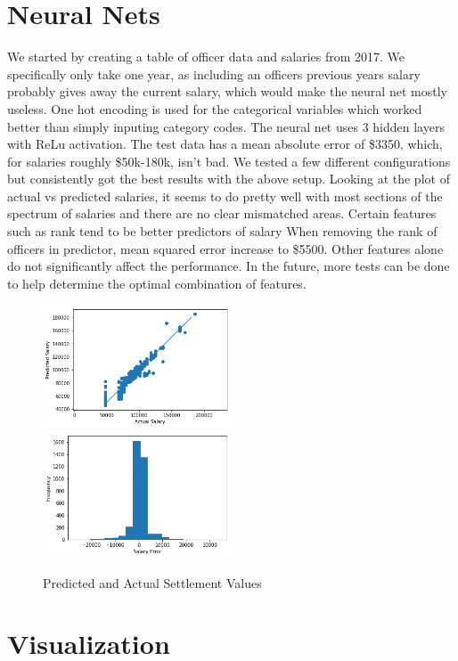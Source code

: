 \documentclass[11pt]{article}
\begin{document}
\FloatBarrier
\section{Neural Nets}

We started by creating a table of officer data and salaries from 2017. We specifically only take one year, as including an officers previous years salary probably gives away the current salary, which would make the neural net mostly useless. One hot encoding is used for the categorical variables which worked better than simply inputing category codes. The neural net uses 3 hidden layers with ReLu activation. The test data has a mean absolute error of \$3350, which, for salaries roughly \$50k-180k, isn't bad. We tested a few different configurations but consistently got the best results with the above setup. Looking at the plot of actual vs predicted salaries, it seems to do pretty well with most sections of the spectrum of salaries and there are no clear mismatched areas.
Certain features such as rank tend to be better predictors of salary
When removing the rank of officers in predictor, mean squared error increase to \$5500. Other features alone do not significantly affect the performance. In the future, more tests can be done to help determine the optimal combination of features.

\begin{figure}[h]
\caption{Predicted and Actual Settlement Values}
\includegraphics[width=0.5\textwidth]{pred.png}
\includegraphics[width=0.5\textwidth]{error.png}
\end{figure}

\FloatBarrier
\section{Visualization}
\end{document}
